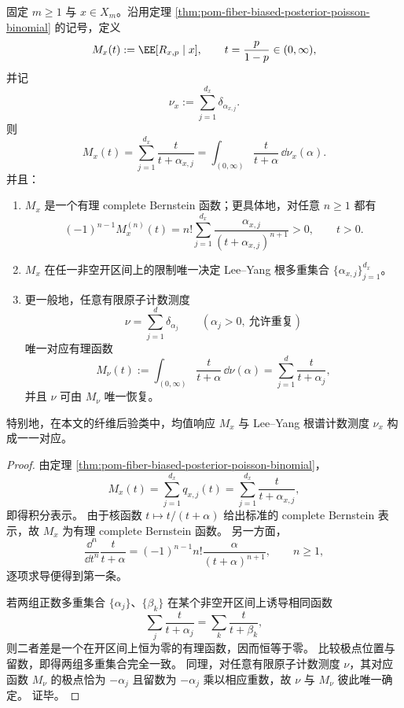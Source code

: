 \begin{theorem}\label{thm:pom-fiber-mean-response-complete-bernstein-root-recovery}
固定 \(m\ge 1\) 与 \(x\in X_m\)。沿用定理 \ref{thm:pom-fiber-biased-posterior-poisson-binomial} 的记号，定义
\[
M_x(t):=\EE[R_{x,p}\mid x],
\qquad
t=\frac{p}{1-p}\in(0,\infty),
\]
并记
\[
\nu_x:=\sum_{j=1}^{d_x}\delta_{\alpha_{x,j}}.
\]
则
\[
M_x(t)
=
\sum_{j=1}^{d_x}\frac{t}{t+\alpha_{x,j}}
=
\int_{(0,\infty)}\frac{t}{t+\alpha}\,\dd\nu_x(\alpha).
\]
并且：
\begin{enumerate}
  \item \(M_x\) 是一个有理 complete Bernstein 函数；更具体地，对任意 \(n\ge 1\) 都有
  \[
  (-1)^{n-1}M_x^{(n)}(t)
  =
  n!\sum_{j=1}^{d_x}\frac{\alpha_{x,j}}{(t+\alpha_{x,j})^{n+1}}
  >0,
  \qquad t>0.
  \]
  \item \(M_x\) 在任一非空开区间上的限制唯一决定 Lee--Yang 根多重集合 \(\{\alpha_{x,j}\}_{j=1}^{d_x}\)。
  \item 更一般地，任意有限原子计数测度
  \[
  \nu=\sum_{j=1}^{d}\delta_{\alpha_j}
  \qquad(\alpha_j>0,\ \text{允许重复})
  \]
  唯一对应有理函数
  \[
  M_\nu(t):=\int_{(0,\infty)}\frac{t}{t+\alpha}\,\dd\nu(\alpha)
  =
  \sum_{j=1}^{d}\frac{t}{t+\alpha_j},
  \]
  并且 \(\nu\) 可由 \(M_\nu\) 唯一恢复。
\end{enumerate}
特别地，在本文的纤维后验类中，均值响应 \(M_x\) 与 Lee--Yang 根谱计数测度 \(\nu_x\) 构成一一对应。
\end{theorem}
\begin{proof}
由定理 \ref{thm:pom-fiber-biased-posterior-poisson-binomial}，
\[
M_x(t)=\sum_{j=1}^{d_x}q_{x,j}(t)=\sum_{j=1}^{d_x}\frac{t}{t+\alpha_{x,j}},
\]
即得积分表示。
由于核函数 \(t\mapsto t/(t+\alpha)\) 给出标准的 complete Bernstein 表示，故 \(M_x\) 为有理 complete Bernstein 函数。
另一方面，
\[
\frac{\dd^n}{\dd t^n}\frac{t}{t+\alpha}
=
(-1)^{n-1}n!\frac{\alpha}{(t+\alpha)^{n+1}},
\qquad n\ge 1,
\]
逐项求导便得到第一条。

若两组正数多重集合 \(\{\alpha_j\}\)、\(\{\beta_k\}\) 在某个非空开区间上诱导相同函数
\[
\sum_j\frac{t}{t+\alpha_j}
=
\sum_k\frac{t}{t+\beta_k},
\]
则二者差是一个在开区间上恒为零的有理函数，因而恒等于零。
比较极点位置与留数，即得两组多重集合完全一致。
同理，对任意有限原子计数测度 \(\nu\)，其对应函数 \(M_\nu\) 的极点恰为 \(-\alpha_j\) 且留数为 \(-\alpha_j\) 乘以相应重数，故 \(\nu\) 与 \(M_\nu\) 彼此唯一确定。
证毕。
\end{proof}


